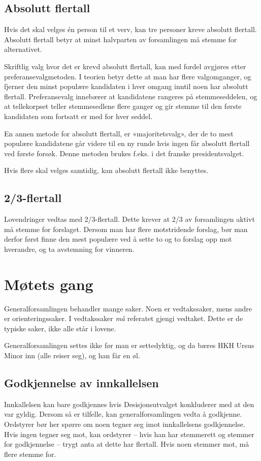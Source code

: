 \subsection{Absolutt flertall}
Hvis det skal velges én person til et verv, kan tre personer kreve absolutt flertall. Absolutt flertall
betyr at minst halvparten av forsamlingen må stemme for alternativet.

Skriftlig valg hvor det er krevd absolutt flertall, kan med fordel avgjøres etter preferansevalgmetoden.
I teorien betyr dette at man har flere valgomganger, og fjerner den minst populære kandidaten i hver omgang
inntil noen har absolutt flertall. Preferansevalg innebærer at kandidatene rangeres på stemmeseddelen,
og at tellekorpset teller stemmesedlene flere ganger og gir stemme til den første kandidaten som fortsatt er med
for hver seddel.

En annen metode for absolutt flertall, er «majoritetsvalg», der de to mest populære kandidatene går videre til
en ny runde hvis ingen får absolutt flertall ved første forsøk. Denne metoden brukes f.eks. i det franske presidentsvalget.

Hvis flere skal velges samtidig, kan absolutt flertall ikke benyttes.

\subsection{2/3-flertall}
Lovendringer vedtas med 2/3-flertall. Dette krever at 2/3 av forsamlingen aktivt må stemme for forslaget.
Dersom man har flere motstridende forslag, bør man derfor først finne den mest populære ved å sette to og to
forslag opp mot hverandre, og ta avstemning for vinneren.

\section{Møtets gang}
Generalforsamlingen behandler mange saker. Noen er vedtakssaker, mens andre er orienteringssaker.
I vedtakssaker \emph{må} referatet gjengi vedtaket. Dette er de typiske saker, ikke alle står i lovene.

Generalforsamlingen settes ikke før man er settedyktig, og da bæres HKH Ursus Minor inn (alle reiser seg), og
han får en øl.

\subsection{Godkjennelse av innkallelsen}
Innkallelsen kan bare godkjennes hvis Desisjonsutvalget konkluderer med at den var gyldig.
Dersom så er tilfelle, kan generalforsamlingen vedta å godkjenne. Ordstyrer bør her spørre
om noen tegner seg imot innkallelsens godkjennelse. Hvis ingen tegner seg mot, kan ordstyrer
– hvis han har stemmerett og stemmer for godkjennelse – trygt anta at dette har flertall.
Hvis noen stemmer mot, må flere stemme for.

